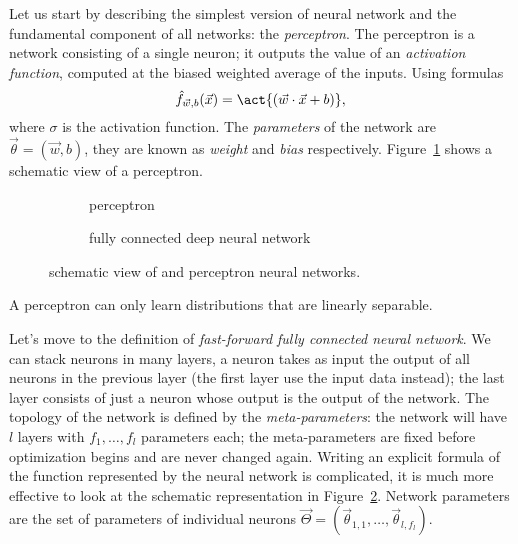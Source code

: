 Let us start by describing the simplest version of neural network and the fundamental component of all networks: the \emph{perceptron}.
The perceptron is a network consisting of a single neuron; it outputs the value of an \emph{activation function}, computed at the biased weighted average of the inputs.
Using formulas
\[
  \hat{f}_{\vec{w},b}{(\vec{x})} = \act{\left(\vec{w}\cdot\vec{x}+b\right)},
\]
where \(\sigma\) is the activation function. The \emph{parameters} of the network are \(\vec{\theta}=(\vec{w},b)\),
they are known as \emph{weight} and \emph{bias} respectively.
Figure~\ref{fig:nn_perceptron} shows a schematic view of a perceptron.
\begin{figure}
  \centering
  \begin{subfigure}{0.495\textwidth}
    \begin{tikzpicture}[x=1.5cm, y=1.2cm, >=latex]
      
    \end{tikzpicture}
    \caption{perceptron}
    \label{fig:nn_perceptron}
  \end{subfigure}
  \begin{subfigure}{0.495\textwidth}
    \begin{tikzpicture}[x=1.cm, y=1.cm, >=latex]
      
    \end{tikzpicture}
    \caption{fully connected deep neural network}
    \label{fig:nn_ffnn}
  \end{subfigure}
  \caption{
    schematic view of and perceptron neural networks.
  }
  \label{fig:nn}
\end{figure}
A perceptron can only learn distributions that are linearly separable.

Let's move to the definition of \emph{fast-forward fully connected neural network}.
We can stack neurons in many layers, a neuron takes as input the output of all neurons in the previous layer (the first layer use the input data instead);
the last layer consists of just a neuron whose output is the output of the network.
The topology of the network is defined by the \emph{meta-parameters}: the network will have \(l\) layers with \(f_1,\dots,f_l\) parameters each;
the meta-parameters are fixed before optimization begins and are never changed again.
Writing an explicit formula of the function represented by the neural network is complicated,
it is much more effective to look at the schematic representation in Figure~\ref{fig:nn_ffnn}.
Network parameters are the set of parameters of individual neurons \(\vec{\Theta} = (\vec{\theta}_{1,1},\dots,\vec{\theta}_{l,f_l})\).

